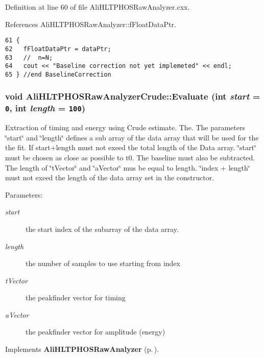 Definition at line 60 of file Ali\-HLTPHOSRaw\-Analyzer.cxx.

References Ali\-HLTPHOSRaw\-Analyzer::f\-Float\-Data\-Ptr.

\footnotesize\begin{verbatim}61 {
62   fFloatDataPtr = dataPtr;  
63   //  n=N;
64   cout << "Baseline correction not yet implemeted" << endl;
65 } //end BaselineCorrection
\end{verbatim}\normalsize 


\subsubsection{\setlength{\rightskip}{0pt plus 5cm}void Ali\-HLTPHOSRaw\-Analyzer\-Crude::Evaluate (int {\em start} = {\tt 0}, int {\em length} = {\tt 100})\hspace{0.3cm}{\tt  [virtual]}}\label{classAliHLTPHOSRawAnalyzerCrude_AliHLTPHOSRawAnalyzerCrudea4}


Extraction of timing and energy using Crude estimate. The. The parameters \char`\"{}start\char`\"{} and \char`\"{}length\char`\"{} defines a sub array of the data array that will be used for the the fit. If start+length must not exeed the total length of the Data array. \char`\"{}start\char`\"{} must be chosen as close as possible to t0. The baseline must also be subtracted. The length of \char`\"{}t\-Vector\char`\"{} and \char`\"{}a\-Vector\char`\"{} mus be equal to length. \char`\"{}index + length\char`\"{} must not exeed the length of the data array set in the constructor. \begin{Desc}
\item[Parameters:]
\begin{description}
\item[{\em start}]the start index of the subarray of the data array. \item[{\em length}]the number of samples to use starting from index \item[{\em t\-Vector}]the peakfinder vector for timing \item[{\em a\-Vector}]the peakfinder vector for amplitude (energy) \end{description}
\end{Desc}


Implements {\bf Ali\-HLTPHOSRaw\-Analyzer} {\rm (p.\,\pageref{classAliHLTPHOSRawAnalyzer_AliHLTPHOSRawAnalyzerPeakFindera17})}.

